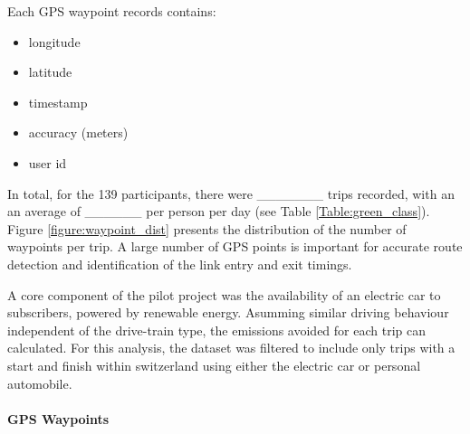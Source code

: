 Each GPS waypoint records contains: 
\begin{itemize}
  \item longitude
  \item latitude
  \item timestamp
  \item accuracy (meters)
  \item user id
\end{itemize}


In total, for the 139 participants, there were _______ trips recorded, with an an average of ______ per person per day (see Table \ref{Table:green_class}). 
Figure \ref{figure:waypoint_dist} presents the distribution of the number of waypoints per trip. 
A large number of GPS points is important for accurate route detection and identification of the link entry and exit timings.

A core component of the pilot project was the availability of an electric car to subscribers, powered by renewable energy.
Asumming similar driving behaviour independent of the drive-train type, the emissions avoided for each trip can calculated.
For this analysis, the dataset was filtered to include only trips with a start and finish within switzerland using either the electric car or personal automobile. 

\paragraph{GPS Waypoints}

